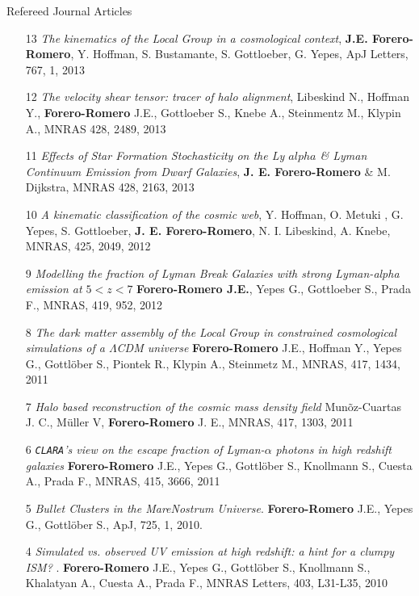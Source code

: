 \documentclass[9pt]{article}
\begin{document}
Refereed Journal Articles
\begin{enumerate}

\item[13] {\it The kinematics of the Local Group in a cosmological context}, 
{\bf J.E. Forero-Romero}, Y. Hoffman, S. Bustamante, S. Gottloeber, G. Yepes, ApJ Letters, 767, 1, 2013


\item[12] {\it The velocity shear tensor: tracer of halo alignment}, Libeskind N., Hoffman Y., {\bf Forero-Romero} J.E., Gottloeber S., Knebe A., Steinmentz M., Klypin A., MNRAS 428, 2489, 2013

\item[11] {\it Effects of Star Formation Stochasticity on the Ly $alpha$ \& Lyman Continuum Emission from Dwarf Galaxies}, {\bf J. E. Forero-Romero} \& M. Dijkstra, MNRAS 428, 2163, 2013

\item[10] {\it A kinematic classification of the cosmic web}, Y. Hoffman, O. Metuki , G. Yepes, S. Gottloeber, {\bf J. E. Forero-Romero}, N. I. Libeskind, A. Knebe, MNRAS, 425, 2049, 2012

\item[9] {\it Modelling the fraction of Lyman Break Galaxies with strong Lyman-alpha emission at $5 < z < 7$} {\bf Forero-Romero J.E.}, Yepes G., Gottloeber S., Prada F., MNRAS, 419, 952, 2012

\item [8]
{\it The dark matter assembly of the Local Group in constrained cosmological
  simulations of a $\Lambda$CDM universe} {\bf Forero-Romero} J.E., Hoffman Y., Yepes G., Gottl\"ober S.,
  Piontek R., Klypin A., Steinmetz M., 
MNRAS, 417, 1434, 2011

\item[7] 
{\it Halo based reconstruction of the cosmic mass density field}
Mun\~oz-Cuartas J. C., M\"uller V, {\bf Forero-Romero} J. E.,
MNRAS, 417, 1303, 2011

\item [6]
{\it {\tt CLARA}'s view on the escape fraction of Lyman-$\alpha$ photons in
  high redshift galaxies}
{\bf Forero-Romero} J.E., Yepes G., Gottl\"ober S., Knollmann S., Cuesta A., Prada F.,  
MNRAS, 415, 3666, 2011

\item [5]
{\it Bullet Clusters in the MareNostrum Universe}. 
{\bf Forero-Romero} J.E., Yepes G., Gottl\"ober S., 
ApJ, 725, 1, 2010.

\item [4]
{\it Simulated vs. observed UV emission at high redshift: a hint for a clumpy
ISM? }. 
{\bf Forero-Romero} J.E., Yepes G., Gottl\"ober S., Knollmann S., Khalatyan A., Cuesta A., Prada F.,   MNRAS Letters, 403,  L31-L35, 2010


\end{enumerate}
\end{document}
